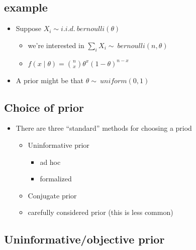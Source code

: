 \subsection{example}

\begin{itemize}
\item Suppose $X_i \sim i.i.d.\ bernoulli(\theta)$
\begin{itemize}
\item we're interested in $\sum_i X_i \sim\ bernoulli(n, \theta)$
\item $f(x \mid \theta) = \binom{n}{x} \theta^x (1-\theta)^{n-x}$
\end{itemize}
\item A prior might be that $\theta \sim\ uniform(0,1)$
\end{itemize}

\subsection{Choice of prior}

\begin{itemize}
\item There are three ``standard'' methods for choosing a priod
\begin{itemize}
\item Uninformative prior
\begin{itemize}
\item ad hoc
\item formalized
\end{itemize}
\item Conjugate prior
\item carefully considered prior (this is less common)
\end{itemize}
\end{itemize}

\subsection{Uninformative/objective prior}

